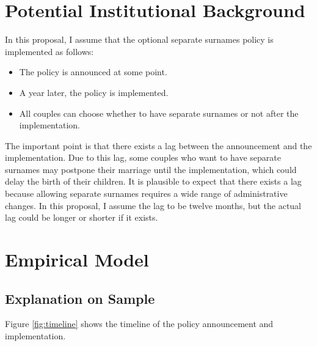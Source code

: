 \documentclass[12pt]{article}
\begin{document}
\section{Potential Institutional Background}
In this proposal, I assume that the optional separate surnames policy is implemented as follows: 
\begin{itemize}
  \item The policy is announced at some point. 
  \item A year later, the policy is implemented.
  \item All couples can choose whether to have separate surnames or not after the implementation.
\end{itemize}
The important point is that there exists a lag between the announcement and the implementation.
Due to this lag, some couples who want to have separate surnames may postpone their marriage until the implementation, which could delay the birth of their children.
It is plausible to expect that there exists a lag because allowing separate surnames requires a wide range of administrative changes.
In this proposal, I assume the lag to be twelve months, but the actual lag could be longer or shorter if it exists.

\section{Empirical Model}
\subsection*{Explanation on Sample}
Figure \ref{fig:timeline} shows the timeline of the policy announcement and implementation.
\end{document}
